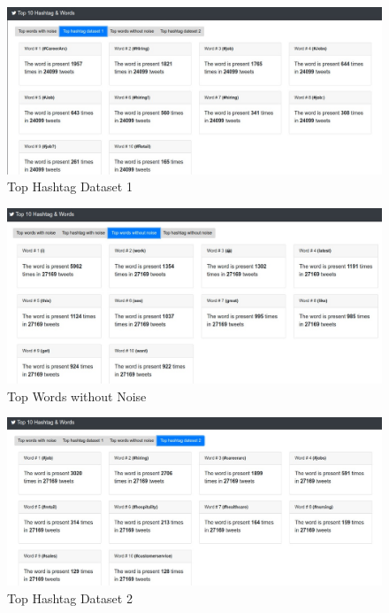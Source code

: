 \documentclass{article}
\newcommand*\setcaptioncitation[1]{\def\captioncitation{\textit{Source:}~#1}}
\let\captioncitation\relax
\begin{document}
        \begin{figure}[H]
            \centering 
            \includegraphics[width=1\linewidth]{./img/tophashtagdataset1.jpeg}
            \setcaptioncitation{self-made}
            \caption{Top Hashtag Dataset 1}
            \label{fig: Top Hashtag Dataset 1}
        \end{figure}
        
        \begin{figure}[H]
            \centering 
            \includegraphics[width=1\linewidth]{./img/topwordswithoutnoise.jpeg}
            \setcaptioncitation{self-made}
            \caption{Top Words without Noise}
            \label{fig: Top Words without Noise}
        \end{figure}
        
        \begin{figure}[H]
            \centering 
            \includegraphics[width=1\linewidth]{./img/tophashtagdataset2.jpeg}
            \setcaptioncitation{self-made}
            \caption{Top Hashtag Dataset 2}
            \label{fig: Top Hashtag Dataset 2}
        \end{figure}
\end{document}
